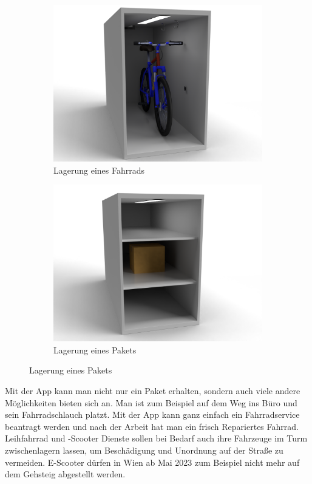 \begin{figure}[H]
  \centering
  \begin{subfigure}{0.4\textwidth}
    \centering
    \includegraphics[width=\textwidth]{images/box_bike.png}
    \caption{Lagerung eines Fahrrads}
    \label{fig:storing_bike}
  \end{subfigure}
  \begin{subfigure}{0.4\textwidth}
    \centering
    \includegraphics[width=\textwidth]{images/box_item.png}
    \caption{Lagerung eines Pakets}
    \label{fig:storing_item}
  \end{subfigure}
\end{figure}

Mit der App kann man nicht nur ein Paket erhalten, sondern auch viele andere Möglichkeiten bieten sich an. Man ist zum Beispiel auf dem Weg ins Büro und sein Fahrradschlauch platzt. Mit der App kann ganz einfach ein Fahrradservice beantragt werden und nach der Arbeit hat man ein frisch Repariertes Fahrrad. Leihfahrrad und -Scooter Dienste sollen bei Bedarf auch ihre Fahrzeuge im Turm zwischenlagern lassen, um Beschädigung und Unordnung auf der Straße zu vermeiden. E-Scooter dürfen in Wien ab Mai 2023 zum Beispiel nicht mehr auf dem Gehsteig abgestellt werden\cite{krutzler_wien_2022}.